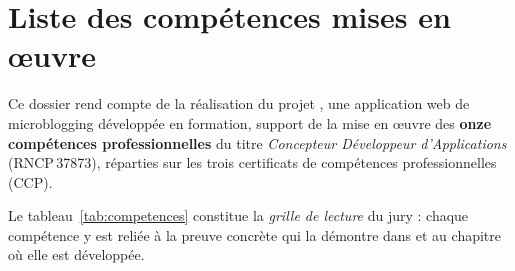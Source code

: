 \chapter{Liste des compétences mises en œuvre}
\label{ch:competences}

Ce dossier rend compte de la réalisation du projet \projet{}, une application web de
microblogging développée en formation, support de la mise en œuvre des \textbf{onze
compétences professionnelles} du titre \emph{Concepteur Développeur d'Applications}
(RNCP\,37873), réparties sur les trois certificats de compétences professionnelles (CCP).

Le tableau~\ref{tab:competences} constitue la \emph{grille de lecture} du jury : chaque
compétence y est reliée à la preuve concrète qui la démontre dans \projet{} et au chapitre
où elle est développée.

